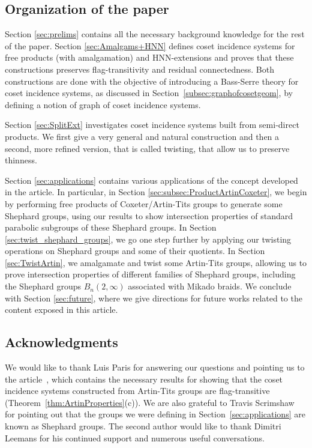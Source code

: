 \documentclass[11pt,letterpaper]{amsart}
\begin{document}
\subsection{Organization of the paper}

Section \ref{sec:prelims} contains all the necessary background knowledge for the rest of the paper.
Section \ref{sec:Amalgams+HNN} defines coset incidence systems for free products (with amalgamation) and HNN-extensions and proves that these constructions preserves flag-transitivity and residual connectedness. Both constructions are done with the objective of introducing a Bass-Serre theory for coset incidence systems, as discussed in Section~\ref{subsec:graphofcosetgeom}, by defining a notion of graph of coset incidence systems.

Section \ref{sec:SplitExt} investigates coset incidence systems built from semi-direct products. We first give a very general and natural construction and then a second, more refined version, that is called twisting, that allow us to preserve thinness.

Section \ref{sec:applications} contains various applications of the concept developed in the article. In particular, in Section \ref{sec:subsec:ProductArtinCoxeter}, we begin by performing free products of Coxeter/Artin-Tits groups to generate some Shephard groups, using our results to show intersection properties of standard parabolic subgroups of these Shephard groups. In Section \ref{sec:twist_shephard_groups}, we go one step further by applying our twisting operations on Shephard groups and some of their quotients.
In Section \ref{sec:TwistArtin}, we amalgamate and twist some Artin-Tits groups, allowing us to prove intersection properties 
of different families of Shephard groups, including the Shephard groups $B_n(2,\infty)$ associated with Mikado braids.
We conclude with Section \ref{sec:future}, where we give directions for future works related to the content exposed in this article.

\subsection{Acknowledgments}
We would like to thank Luis Paris for answering our questions and pointing us to the article~\cite{ParisGodelle2012}, which contains the necessary results for showing that the coset incidence systems constructed from Artin-Tits groups are flag-transitive (Theorem~\ref{thm:ArtinProperties}(c)).
We are also grateful to Travis Scrimshaw for pointing out that the groups we were defining in Section~\ref{sec:applications} are known as Shephard groups. The second author would like to thank Dimitri Leemans for his continued support and numerous useful conversations.
\end{document}
